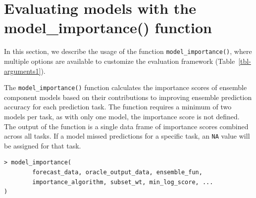 \documentclass[
  article,
  shortnames,
  notitle]{jss}
\begin{document}
\section{Evaluating models with the model\_importance()
function}\label{sec:main-function}

In this section, we describe the usage of the function
\texttt{model\_importance()}, where multiple options are available to
customize the evaluation framework (Table~\ref{tbl-arguments1}).

The \texttt{model\_importance()} function calculates the importance
scores of ensemble component models based on their contributions to
improving ensemble prediction accuracy for each prediction task. The
function requires a minimum of two models per task, as with only one
model, the importance score is not defined. The output of the function
is a single data frame of importance scores combined across all tasks.
If a model missed predictions for a specific task, an \texttt{NA} value
will be assigned for that task.

\begin{verbatim}
> model_importance(
        forecast_data, oracle_output_data, ensemble_fun, 
        importance_algorithm, subset_wt, min_log_score, ...
)
\end{verbatim}
\end{document}
